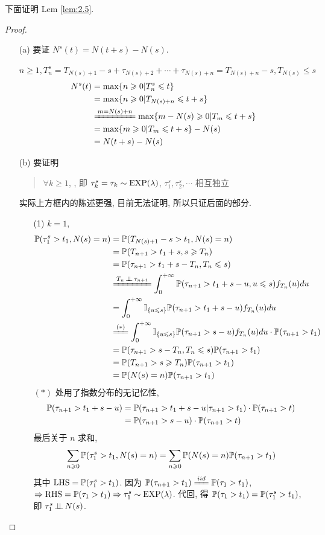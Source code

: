 下面证明 Lem \ref{lem:2.5}.
\begin{proof}
\begin{enumerate}
    \item[(a)] 要证 $N^s(t)=N(t+s)-N(s)$. 
    
    $n\geq 1, T_n^s=T_{N(s)+1}-s+\tau_{N(s)+2}+\cdots +\tau_{N(s)+n}=T_{N(s)+n}-s, T_{N(s)}\leq s$
    \[
    \begin{aligned}
        N^s(t)&=\max\{n\geq 0|T_n^s\leq t\}\\
        &=\max\{n\geq 0|T_{N(s)+n}\leq t+s\}\\
        &\xlongequal{m=N(s)+n}\max\{m-N(s)\geq 0|T_m\leq t+s\}\\
        &=\max\{m\geq 0|T_m\leq t+s\}-N(s)\\
        &=N(t+s)-N(s)
    \end{aligned}
    \]
    \item[(b)] 要证明
    \begin{quote}
        $\forall k\geq 1$, , 即 $\tau_k^s=\tau_k\sim \operatorname{EXP}(\lambda)$, $\tau_1^s, \tau_2^s, \cdots$ 相互独立
    \end{quote}
    实际上方框内的陈述更强, 目前无法证明, 所以只证后面的部分.
    \begin{enumerate}
        \item[(1)] $k=1$,
        \[
        \begin{aligned}
        \PP(\tau_1^s>t_1,N(s)=n) &=\PP(T_{N(s)+1}-s>t_1,N(s)=n)\\
        &=\PP(T_{n+1}>t_1+s,s\geq T_n)\\
        &=\PP(\tau_{n+1}>t_1+s-T_n, T_n\leq s)\\
        &\xlongequal{T_n\ind \tau_{n+1}}\int_0^{+\infty}\PP(\tau_{n+1}>t_1+s-u,u\leq s)f_{T_n}(u)du\\
        &=\int_0^{+\infty}\II_{\{u\leq s\}}\PP(\tau_{n+1}>t_1+s-u)f_{T_n}(u)du\\
        &\xlongequal{(*)}\int_0^{+\infty}\II_{\{u\leq s\}}\PP(\tau_{n+1}>s-u)f_{T_n}(u)du\cdot \PP(\tau_{n+1}>t_1)\\
        &=\PP(\tau_{n+1}>s-T_n,T_n\leq s)\PP(\tau_{n+1}>t_1)\\
        &=\PP(T_{n+1}>s\geq T_n)\PP(\tau_{n+1}>t_1)\\
        &=\PP(N(s)=n)\PP(\tau_{n+1}>t_1)
        \end{aligned}
        \]
        $(*)$ 处用了指数分布的无记忆性, 
        \[
        \begin{aligned}
				\mathbb{P}(\tau_{n+1}>t_1+s-u)&=\mathbb{P}(\tau_{n+1}>t_1+s-u|\tau_{n+1}>t_1)\cdot \mathbb{P}(\tau_{n+1}>t)\\
				&=\mathbb{P}(\tau_{n+1}>s-u)\cdot \mathbb{P}(\tau_{n+1}>t)
				\end{aligned}
        \]
        最后关于 $n$ 求和, 
        \[
        \sum_{n\geqslant 0}\mathbb{P}(\tau_1^s>t_1,N(s)=n)=\sum_{n\geqslant 0}\mathbb{P}(N(s)=n)\mathbb{P}(\tau_{n+1}>t_1)
        \]
        其中 $\operatorname{LHS}=\mathbb{P}(\tau_1^s>t_1)$. 因为 $\PP(\tau_{n+1}>t_1)\xlongequal{iid}\PP(\tau_{1}>t_1)$, $\Rightarrow \operatorname{RHS}=\mathbb{P}(\tau_{1}>t_1) \Rightarrow \tau_1^s\sim \operatorname{EXP}(\lambda)$. 代回, 得 $\mathbb{P}(\tau_1>t_1)=\mathbb{P}(\tau_1^s>t_1)$, 即 $\tau_1^s\operatorname{\perp\!\!\!\perp} N(s)$.


\end{enumerate}
\end{enumerate}
\end{proof}
